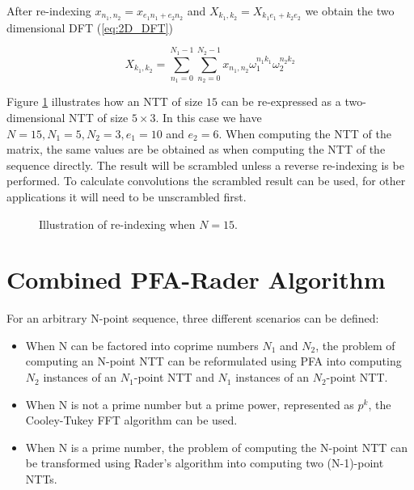 \documentclass[english,master=eelt,masteroption=ec]{kulemt}
\begin{document}
After re-indexing $x_{n_1,n_2} = x_{e_1 n_1 + e_2 n_2}$ and $X_{k_1,k_2} = X_{k_1 e_1 + k_2 e_2}$ we obtain the two dimensional DFT (\ref{eq:2D_DFT})

\begin{equation}
\label{eq:2D_DFT}
X_{k_1,k_2} = \sum_{n_1=0}^{N_1-1}\sum_{n_2=0}^{N_2-1} x_{n_1,n_2} \omega_1^{n_1 k_1} \omega_2^{n_2 k_2}
\end{equation}

Figure \ref{fig:pfa_illustration} illustrates how an NTT of size $15$ can be re-expressed as a two-dimensional NTT of size $5 \times 3$. In this case we have $N = 15, N_1 = 5, N_2 = 3, e_1 = 10$ and $e_2 = 6$. When computing the NTT of the matrix, the same values are be obtained as when computing the NTT of the sequence directly. The result will be scrambled unless a reverse re-indexing is be performed. To calculate convolutions the scrambled result can be used, for other applications it will need to be unscrambled first.

\begin{figure}[h]
\setcounter{MaxMatrixCols}{20}
\caption{Illustration of re-indexing when $N = 15$.}
\label{fig:pfa_illustration}
\end{figure}


\section{Combined PFA-Rader Algorithm}
\label{section:pfa_rader_alg}

For an arbitrary N-point sequence, three different scenarios can be defined:
\begin{itemize}
  \item When N can be factored into coprime numbers $N_1$ and $N_2$, the problem of computing an N-point NTT can be reformulated using PFA into computing $N_2$ instances of an $N_1$-point NTT and $N_1$ instances of an $N_2$-point NTT.
  \item When N is not a prime number but a prime power, represented as $p^k$, the Cooley-Tukey FFT algorithm can be used. \cite{Cooley1965AnAF}
  \item When N is a prime number, the problem of computing the N-point NTT can be transformed using Rader's algorithm into computing two (N-1)-point NTTs.
\end{itemize}
\end{document}
